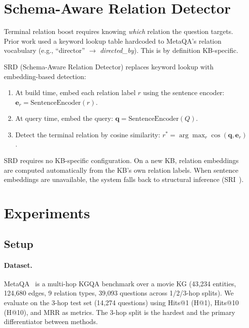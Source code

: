 \documentclass[10pt,twocolumn]{article}
\newcommand{\SRD}{\textsc{SRD}}
\begin{document}
\section{Schema-Aware Relation Detector}
\label{sec:srd}

Terminal relation boost requires knowing \emph{which} relation the question
targets. Prior work used a keyword lookup table hardcoded to MetaQA's relation
vocabulary (e.g., ``director'' $\to$ \emph{directed\_by}). This is by definition
KB-specific.

\SRD{} (Schema-Aware Relation Detector) replaces keyword lookup with
embedding-based detection:

\begin{enumerate}
  \item At build time, embed each relation label $r$ using the sentence encoder:
        $\mathbf{e}_r = \mathrm{SentenceEncoder}(r)$.
  \item At query time, embed the query: $\mathbf{q} = \mathrm{SentenceEncoder}(Q)$.
  \item Detect the terminal relation by cosine similarity:
        $r^* = \arg\max_r \cos(\mathbf{q}, \mathbf{e}_r)$.
\end{enumerate}

\noindent \SRD{} requires no KB-specific configuration. On a new KB,
relation embeddings are computed automatically from the KB's own relation labels.
When sentence embeddings are unavailable, the system falls back to structural
inference (\textsc{SRI}~\cite{buchorn2026report}).

\section{Experiments}
\label{sec:experiments}

\subsection{Setup}
\paragraph{Dataset.}
MetaQA~\cite{metaqa2017} is a multi-hop KGQA benchmark over a movie KG
(43,234 entities, 124,680 edges, 9 relation types, 39,093 questions across
1/2/3-hop splits). We evaluate on the 3-hop test set (14,274 questions) using
Hits@1 (H@1), Hits@10 (H@10), and MRR as metrics. The 3-hop split is the
hardest and the primary differentiator between methods.
\end{document}
